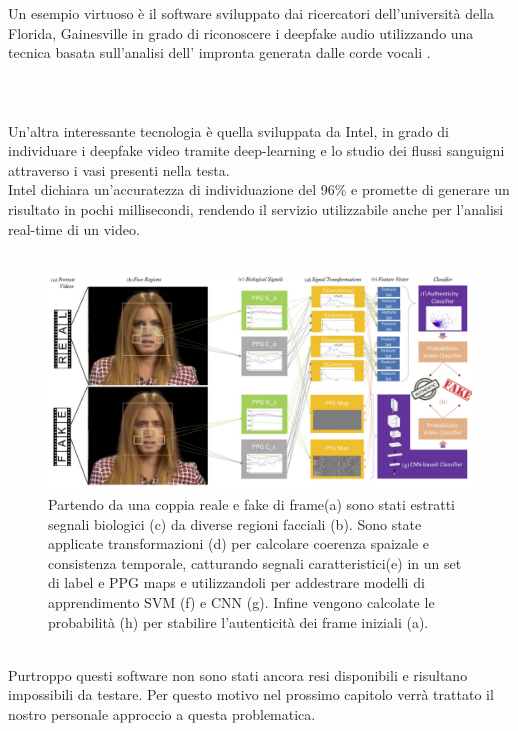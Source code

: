 \documentclass[12pt, a4paper]{article}
\begin{document}
Un esempio virtuoso è il software sviluppato dai ricercatori dell'università della Florida, Gainesville in grado di riconoscere i deepfake audio utilizzando una tecnica basata sull'analisi dell' impronta generata dalle corde vocali \cite{280020}. \\\\\\\\
Un'altra interessante tecnologia è quella sviluppata da Intel, in grado di individuare i deepfake video tramite deep-learning e lo studio dei flussi sanguigni attraverso i vasi presenti nella testa.\\
Intel dichiara un'accuratezza di individuazione del 96\% e promette di generare un risultato in pochi millisecondi, rendendo il servizio utilizzabile anche per l'analisi real-time di un video.\cite{DBLP:journals/corr/abs-1901-02212} \\\\
\begin{figure}[h]
    \centering
    \includegraphics[width=1\textwidth]{img/bloodDetector.png}
    \caption{Partendo da una coppia reale e fake di frame(a) sono stati estratti segnali biologici (c) da diverse regioni facciali (b). Sono state applicate transformazioni (d) per calcolare coerenza spaizale e consistenza temporale, catturando segnali caratteristici(e) in un set di label e PPG maps e utilizzandoli per addestrare modelli di apprendimento SVM (f) e CNN (g). Infine vengono calcolate le probabilità (h) per stabilire l'autenticità dei frame iniziali (a). }
    \label{fig:mesh1}
\end{figure} \\
Purtroppo questi software non sono stati ancora resi disponibili e risultano impossibili da testare. Per questo motivo nel prossimo capitolo verrà trattato il nostro personale approccio a questa problematica.
\newpage
\end{document}
